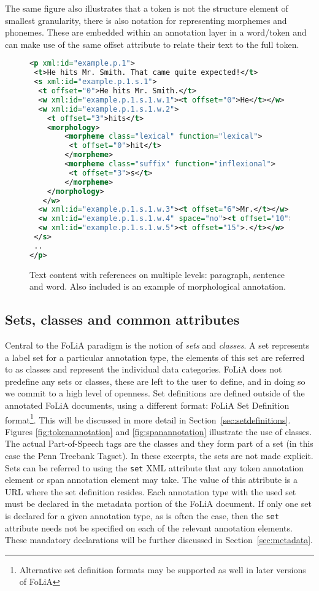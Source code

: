 \documentclass[a4paper,10pt,twoside]{article}
\begin{document}
The same figure also illustrates that a token is not the structure element of
smallest granularity, there is also notation for representing morphemes and
phonemes. These are embedded within an annotation layer in a word/token and
can make use of the same offset attribute to relate their text to the full token.

\begin{figure}[tbh]
\begin{lstlisting}[language=xml]
<p xml:id="example.p.1">
 <t>He hits Mr. Smith. That came quite expected!</t>
 <s xml:id="example.p.1.s.1">
  <t offset="0">He hits Mr. Smith.</t>
  <w xml:id="example.p.1.s.1.w.1"><t offset="0">He</t></w>
  <w xml:id="example.p.1.s.1.w.2">
    <t offset="3">hits</t>
    <morphology> 
        <morpheme class="lexical" function="lexical">
         <t offset="0">hit</t>
        </morpheme>
        <morpheme class="suffix" function="inflexional">
         <t offset="3">s</t>
        </morpheme>
    </morphology>
   </w>
  <w xml:id="example.p.1.s.1.w.3"><t offset="6">Mr.</t></w>
  <w xml:id="example.p.1.s.1.w.4" space="no"><t offset="10">Smith</t></w>
  <w xml:id="example.p.1.s.1.w.5"><t offset="15">.</t></w>
 </s>
 ..
</p>
\end{lstlisting}
\caption{Text content with references on multiple levels: paragraph, sentence
and word. Also included is an example of morphological annotation.\label{fig:textcontent}}
\end{figure}


\subsection{Sets, classes and common attributes}

Central to the FoLiA paradigm is the notion of \emph{sets} and \emph{classes}.
A set represents a label set for a particular annotation type, the elements of
this set are referred to as classes and represent the individual data
categories. FoLiA does not predefine any sets or classes, these are left to the
user to define, and in doing so we commit to a high level of openness. Set
definitions are defined outside of the annotated FoLiA documents, using a
different format: FoLiA Set Definition format\footnote{Alternative set
definition formats may be supported as well in later versions of FoLiA}. This
will be discussed in more detail in Section~\ref{sec:setdefinitions}. Figures
\ref{fig:tokenannotation} and \ref{fig:spanannotation} illustrate the use of
classes. The actual Part-of-Speech tags are the classes and they form part of a
set (in this case the Penn Treebank Tagset). In these excerpts, the sets are
not made explicit. Sets can be referred to using the \texttt{set} XML attribute
that any token annotation element or span annotation element may take. The
value of this attribute is a URL where the set definition resides. Each
annotation type with the used set must be declared in the metadata portion of
the FoLiA document. If only one set is declared for a given annotation type, as
is often the case, then the \texttt{set} attribute needs not be specified on
each of the relevant annotation elements. These mandatory declarations will be
further discussed in Section~\ref{sec:metadata}. 
\end{document}
